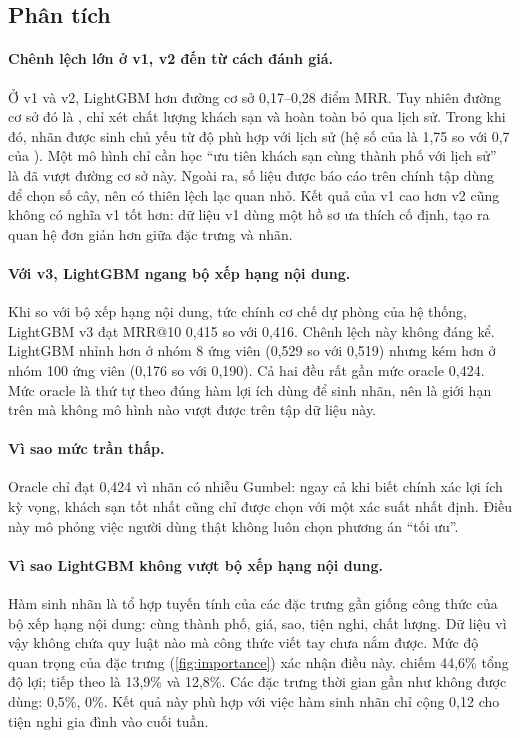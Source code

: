 \subsection{Phân tích}

\paragraph{Chênh lệch lớn ở v1, v2 đến từ cách đánh giá.} Ở v1 và v2, LightGBM hơn đường cơ sở 0,17--0,28 điểm MRR. Tuy nhiên đường cơ sở đó là , chỉ xét chất lượng khách sạn và hoàn toàn bỏ qua lịch sử. Trong khi đó, nhãn được sinh chủ yếu từ độ phù hợp với lịch sử (hệ số của  là 1,75 so với 0,7 của ). Một mô hình chỉ cần học ``ưu tiên khách sạn cùng thành phố với lịch sử'' là đã vượt đường cơ sở này. Ngoài ra, số liệu được báo cáo trên chính tập dùng để chọn số cây, nên có thiên lệch lạc quan nhỏ. Kết quả của v1 cao hơn v2 cũng không có nghĩa v1 tốt hơn: dữ liệu v1 dùng một hồ sơ ưa thích cố định, tạo ra quan hệ đơn giản hơn giữa đặc trưng và nhãn.

\paragraph{Với v3, LightGBM ngang bộ xếp hạng nội dung.} Khi so với bộ xếp hạng nội dung, tức chính cơ chế dự phòng của hệ thống, LightGBM v3 đạt MRR@10 0,415 so với 0,416. Chênh lệch này không đáng kể. LightGBM nhỉnh hơn ở nhóm 8 ứng viên (0,529 so với 0,519) nhưng kém hơn ở nhóm 100 ứng viên (0,176 so với 0,190). Cả hai đều rất gần mức oracle 0,424. Mức oracle là thứ tự theo đúng hàm lợi ích dùng để sinh nhãn, nên là giới hạn trên mà không mô hình nào vượt được trên tập dữ liệu này.

\paragraph{Vì sao mức trần thấp.} Oracle chỉ đạt 0,424 vì nhãn có nhiễu Gumbel: ngay cả khi biết chính xác lợi ích kỳ vọng, khách sạn tốt nhất cũng chỉ được chọn với một xác suất nhất định. Điều này mô phỏng việc người dùng thật không luôn chọn phương án ``tối ưu''.

\paragraph{Vì sao LightGBM không vượt bộ xếp hạng nội dung.} Hàm sinh nhãn là tổ hợp tuyến tính của các đặc trưng gần giống công thức của bộ xếp hạng nội dung: cùng thành phố, giá, sao, tiện nghi, chất lượng. Dữ liệu vì vậy không chứa quy luật nào mà công thức viết tay chưa nắm được. Mức độ quan trọng của đặc trưng (\cref{fig:importance}) xác nhận điều này.  chiếm 44,6\% tổng độ lợi; tiếp theo là  13,9\% và  12,8\%. Các đặc trưng thời gian gần như không được dùng:  0,5\%,  0\%. Kết quả này phù hợp với việc hàm sinh nhãn chỉ cộng 0,12 cho tiện nghi gia đình vào cuối tuần.


